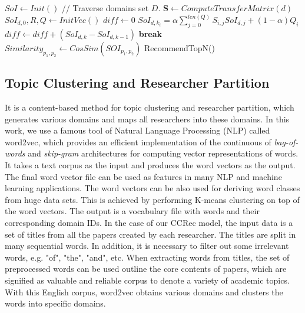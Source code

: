 \documentclass[review]{elsarticle}
\newcommand{\algorithmicbreak}{\textbf{break}}
\newcommand{\BREAK}{\State \algorithmicbreak}
\begin{document}
\begin{algorithm}[H]
  \begin{algorithmic}[1]
  \State $SoI \leftarrow Init()$
   // Traverse domains set $D$.
        \State $\mathbf{S} \leftarrow ComputeTransferMatrix(d)$
        \State $SoI_{d,0}, R, Q \leftarrow InitVec()$
            \State $diff \leftarrow 0$
                \State $SoI_{d,k_{i}} = \alpha\sum_{j=0}^{len(Q)} S_{i,j}SoI_{d,j}+(1-\alpha) Q_{i}$
                \State $diff \leftarrow diff +(SoI_{d,k}-SoI_{d,k-1})$
            \EndFor
                \BREAK
            \EndIf
        \EndFor
  \EndFor
            \State $Similarity_{p_{1},p_{2}} \leftarrow CosSim(SOI_{p_{1},p_{2}})$
        \EndFor
  \EndFor
  \State RecommendTopN()
  \end{algorithmic}
\end{algorithm}


\subsection{Topic Clustering and Researcher Partition}
It is a content-based method for topic clustering and researcher partition, which generates various domains and maps all researchers into these domains. In this work, we use a famous tool of Natural Language Processing (NLP) called word2vec, which provides an efficient implementation of the continuous of \emph{bag-of-words} and \emph{skip-gram} architectures for computing vector representations of words. It takes a text corpus as the input and produces the word vectors as the output. The final word vector file can be used as features in many NLP and machine learning applications. The word vectors can be also used for deriving word classes from huge data sets. This is achieved by performing K-means clustering on top of the word vectors. The output is a vocabulary file with words and their corresponding domain IDs. In the case of our CCRec model, the input data is a set of titles from all the papers created by each researcher. The titles are split in many sequential words. In addition, it is necessary to filter out some irrelevant words, e.g. "of", "the", "and", etc. When extracting words from titles, the set of preprocessed words can be used outline the core contents of papers, which are signified as valuable and reliable corpus to denote a variety of academic topics. With this English corpus, word2vec obtains various domains and clusters the words into specific domains.
\end{document}
